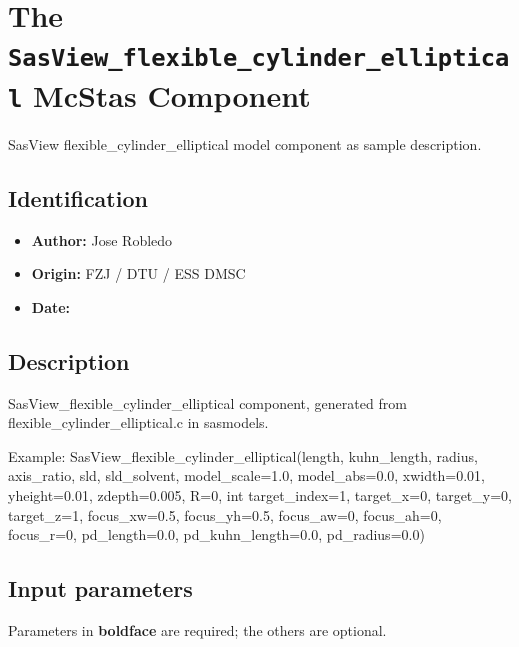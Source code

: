 \section{The \texttt{SasView\_flexible\_cylinder\_elliptical} McStas Component}
SasView flexible\_cylinder\_elliptical model component as sample description.

\subsection*{Identification}
\begin{itemize}
  \item \textbf{Author:} Jose Robledo
  \item \textbf{Origin:} FZJ / DTU / ESS DMSC
  \item \textbf{Date:} 
\end{itemize}

\subsection*{Description}
SasView\_flexible\_cylinder\_elliptical component, generated from flexible\_cylinder\_elliptical.c in sasmodels.

Example: SasView\_flexible\_cylinder\_elliptical(length, kuhn\_length, radius, axis\_ratio, sld, sld\_solvent, model\_scale=1.0, model\_abs=0.0, xwidth=0.01, yheight=0.01, zdepth=0.005, R=0, int target\_index=1, target\_x=0, target\_y=0, target\_z=1, focus\_xw=0.5, focus\_yh=0.5, focus\_aw=0, focus\_ah=0, focus\_r=0, pd\_length=0.0, pd\_kuhn\_length=0.0, pd\_radius=0.0)

\subsection*{Input parameters}
Parameters in \textbf{boldface} are required; the others are optional.

